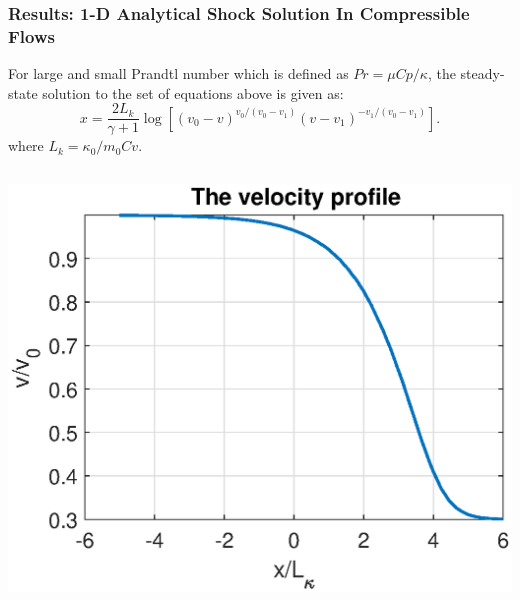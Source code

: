 \documentclass{fancyslides}
\begin{document}
\begin{frame}
 \frametitle{Results: 1-D Analytical Shock Solution In Compressible Flows }
For large and small Prandtl number which is defined as $Pr=\mu Cp/\kappa$, the steady-state solution to the set of equations\cite{Johnson} above is given as:
\begin{equation}
\label{eq:223}
x=\frac{2 L_k}{\gamma+1}\log \left [(v_0 -v)^{v_0/(v_0-v_1)}(v-v_1)^{-v_1/(v_0-v_1)}  \right ].
\end{equation}
where $L_k= \kappa_0/m_0 Cv $.
\begin{columns}
\begin{column}{0.5\textwidth}
   \begin{center}
     \includegraphics[width=1.\textwidth]{1DVel.eps}
     \end{center}


\end{column}
\end{columns}
\end{frame}
\end{document}
